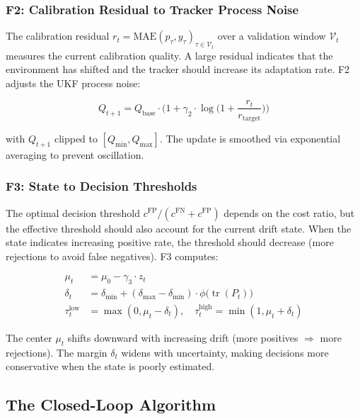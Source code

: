 \documentclass[12pt,a4paper]{article}
\newcommand{\tr}{\operatorname{tr}}
\begin{document}
\subsubsection{F2: Calibration Residual to Tracker Process Noise}

The calibration residual $r_t = \text{MAE}(\hat{p}_\tau, y_\tau)_{\tau \in \mathcal{V}_t}$ over a validation window $\mathcal{V}_t$ measures the current calibration quality. A large residual indicates that the environment has shifted and the tracker should increase its adaptation rate. F2 adjusts the UKF process noise:

\begin{equation}
    Q_{t+1} = Q_{\text{base}} \cdot \Big(1 + \gamma_2 \cdot \log\big(1 + \frac{r_t}{r_{\text{target}}}\big)\Big) \label{eq:f2}
\end{equation}

with $Q_{t+1}$ clipped to $[Q_{\min}, Q_{\max}]$. The update is smoothed via exponential averaging to prevent oscillation.

\subsubsection{F3: State to Decision Thresholds}

The optimal decision threshold $c^{\text{FP}}/(c^{\text{FN}} + c^{\text{FP}})$ depends on the cost ratio, but the effective threshold should also account for the current drift state. When the state indicates increasing positive rate, the threshold should decrease (more rejections to avoid false negatives). F3 computes:

\begin{align}
    \mu_t &= \mu_0 - \gamma_3 \cdot z_t \label{eq:f3_center} \\
    \delta_t &= \delta_{\min} + (\delta_{\max} - \delta_{\min}) \cdot \phi\big(\tr(P_t)\big) \label{eq:f3_margin} \\
    \tau^{\text{low}}_t &= \max(0, \mu_t - \delta_t), \quad
    \tau^{\text{high}}_t = \min(1, \mu_t + \delta_t) \label{eq:f3_thresholds}
\end{align}

The center $\mu_t$ shifts downward with increasing drift (more positives $\Rightarrow$ more rejections). The margin $\delta_t$ widens with uncertainty, making decisions more conservative when the state is poorly estimated.

\subsection{The Closed-Loop Algorithm}
\end{document}
